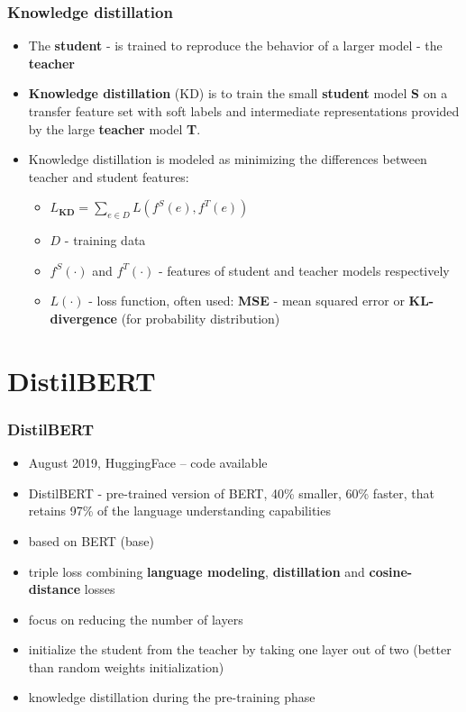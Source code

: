 \documentclass{beamer}
\begin{document}
\begin{frame}
    \frametitle{Knowledge distillation}
    \begin{itemize}
        \item The \textbf{student} - is trained to reproduce the behavior of a larger model - the \textbf{teacher}
        \item \textbf{Knowledge distillation} (KD) is to train the small \textbf{student} model \textbf{S} on a transfer feature set with soft labels and intermediate representations provided by the large \textbf{teacher} model \textbf{T}.
        \item Knowledge distillation is modeled as minimizing the differences between teacher and student features:
        \begin{itemize}
            \item $ {L}_{\textbf{KD}} = \sum_{e \in D} L({f}^{S}(e), {f}^{T}(e)) $
            \item $ D $ - training data
            \item $ {f}^{S}(\cdot) $ and $ {f}^{T}(\cdot) $ - features of student and teacher models respectively
            \item $ L(\cdot) $ - loss function, often used: \textbf{MSE} - mean squared error or \textbf{KL-divergence} (for probability distribution)
        \end{itemize}
    \end{itemize}
\end{frame}



\section{DistilBERT}
\begin{frame}
    \frametitle{DistilBERT \cite{distil_bert}}
    \begin{itemize}
        \item August 2019, HuggingFace -- code available
        \item DistilBERT - pre-trained version of BERT, 40\% smaller, 60\% faster, that retains 97\% of the language understanding capabilities
        \item based on BERT (base)
        \item triple loss combining \textbf{language modeling}, \textbf{distillation} and \textbf{cosine-distance} losses
        \item focus on reducing the number of layers
        \item initialize the student from the teacher by taking one layer out of two (better than random weights initialization)
        \item knowledge distillation during the pre-training phase
    \end{itemize}
\end{frame}
\end{document}

